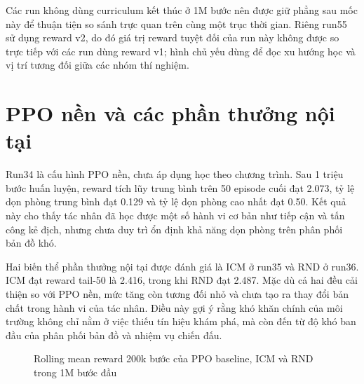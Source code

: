 Các run không dùng curriculum kết thúc ở 1M bước nên được giữ phẳng sau mốc này để thuận tiện so sánh trực quan trên cùng một trục thời gian. Riêng run55 sử dụng reward v2, do đó giá trị reward tuyệt đối của run này không được so trực tiếp với các run dùng reward v1; hình chủ yếu dùng để đọc xu hướng học và vị trí tương đối giữa các nhóm thí nghiệm.

\section{PPO nền và các phần thưởng nội tại}

Run34 là cấu hình PPO nền, chưa áp dụng học theo chương trình. Sau 1 triệu bước huấn luyện, reward tích lũy trung bình trên 50 episode cuối đạt 2.073, tỷ lệ dọn phòng trung bình đạt 0.129 và tỷ lệ dọn phòng cao nhất đạt 0.50. Kết quả này cho thấy tác nhân đã học được một số hành vi cơ bản như tiếp cận và tấn công kẻ địch, nhưng chưa duy trì ổn định khả năng dọn phòng trên phân phối bản đồ khó.

Hai biến thể phần thưởng nội tại được đánh giá là ICM ở run35 và RND ở run36. ICM đạt reward tail-50 là 2.416, trong khi RND đạt 2.487. Mặc dù cả hai đều cải thiện so với PPO nền, mức tăng còn tương đối nhỏ và chưa tạo ra thay đổi bản chất trong hành vi của tác nhân. Điều này gợi ý rằng khó khăn chính của môi trường không chỉ nằm ở việc thiếu tín hiệu khám phá, mà còn đến từ độ khó ban đầu của phân phối bản đồ và nhiệm vụ chiến đấu.

\begin{figure}[H]
    \centering
    \caption{Rolling mean reward 200k bước của PPO baseline, ICM và RND trong 1M bước đầu}
    \label{fig:baseline_intrinsic_reward}
\end{figure}

